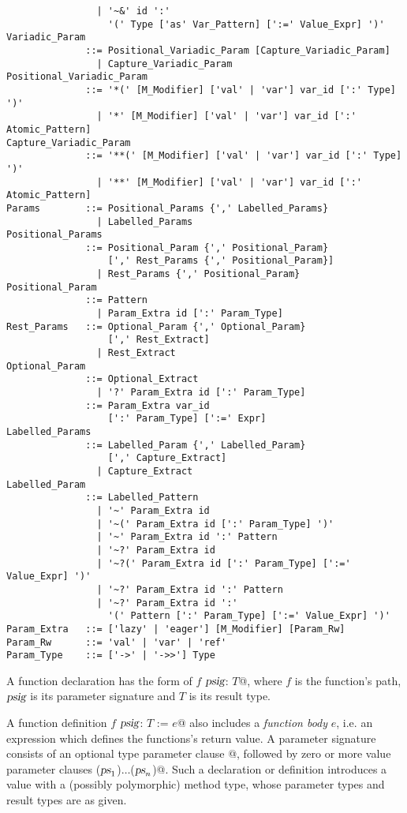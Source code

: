\begin{lstlisting}
                | '~&' id ':' 
                  '(' Type ['as' Var_Pattern] [':=' Value_Expr] ')'
Variadic_Param 
              ::= Positional_Variadic_Param [Capture_Variadic_Param]
                | Capture_Variadic_Param
Positional_Variadic_Param
              ::= '*(' [M_Modifier] ['val' | 'var'] var_id [':' Type] ')'
                | '*' [M_Modifier] ['val' | 'var'] var_id [':' Atomic_Pattern]
Capture_Variadic_Param
              ::= '**(' [M_Modifier] ['val' | 'var'] var_id [':' Type] ')'
                | '**' [M_Modifier] ['val' | 'var'] var_id [':' Atomic_Pattern]
Params        ::= Positional_Params {',' Labelled_Params}
                | Labelled_Params
Positional_Params
              ::= Positional_Param {',' Positional_Param}
                  [',' Rest_Params {',' Positional_Param}]
                | Rest_Params {',' Positional_Param}
Positional_Param
              ::= Pattern
                | Param_Extra id [':' Param_Type]
Rest_Params   ::= Optional_Param {',' Optional_Param}
                  [',' Rest_Extract]
                | Rest_Extract
Optional_Param 
              ::= Optional_Extract
                | '?' Param_Extra id [':' Param_Type]
              ::= Param_Extra var_id
                  [':' Param_Type] [':=' Expr]
Labelled_Params 
              ::= Labelled_Param {',' Labelled_Param}
                  [',' Capture_Extract]
                | Capture_Extract
Labelled_Param 
              ::= Labelled_Pattern
                | '~' Param_Extra id 
                | '~(' Param_Extra id [':' Param_Type] ')'
                | '~' Param_Extra id ':' Pattern
                | '~?' Param_Extra id
                | '~?(' Param_Extra id [':' Param_Type] [':=' Value_Expr] ')'
                | '~?' Param_Extra id ':' Pattern
                | '~?' Param_Extra id ':' 
                  '(' Pattern [':' Param_Type] [':=' Value_Expr] ')'
Param_Extra   ::= ['lazy' | 'eager'] [M_Modifier] [Param_Rw]
Param_Rw      ::= 'val' | 'var' | 'ref'
Param_Type    ::= ['->' | '->>'] Type
\end{lstlisting}

A function declaration has the form of \lstinline@def $f$ $\mbox{\sl psig}$: $T$@, where $f$ is the function's path, $\mbox{\sl psig}$ is its parameter signature and $T$ is its result type. 

A function definition \lstinline@def $f$ $\mbox{\sl psig}$: $T$ := $e$@ also includes a {\em function body} $e$, i.e. an expression which defines the functions's return value. A parameter signature consists of an optional type parameter clause \lstinline@[$\tps$]@, followed by zero or more value parameter clauses \lstinline@($\mbox{\sl ps}_1$)$\ldots$($\mbox{\sl ps}_n$)@. Such a declaration or definition introduces a value with a (possibly polymorphic) method type, whose parameter types and result types are as given. 

